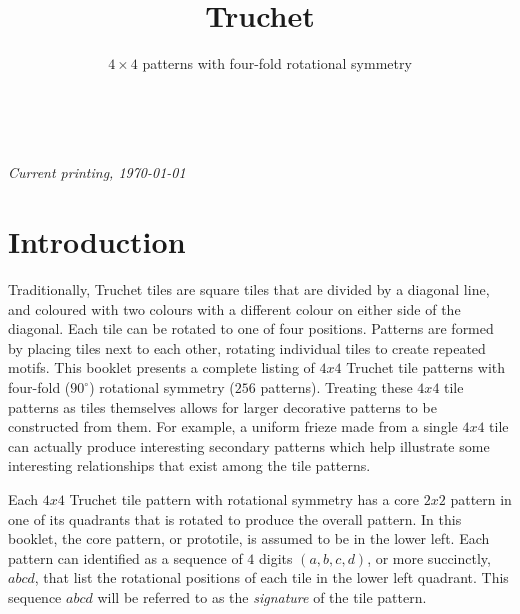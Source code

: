 \documentclass{tufte-book}
\title{Truchet}
\subtitle{$4\times4$ patterns with four-fold rotational symmetry}
\author[]{}
\begin{document}



\maketitle


\newpage
\begin{fullwidth}
~\vfill
\thispagestyle{empty}
\setlength{\parindent}{0pt}
\setlength{\parskip}{\baselineskip}

\par\textit{Current printing, \today}
\end{fullwidth}

\cleardoublepage

\chapter*{Introduction}

\noindent
Traditionally, Truchet tiles are square tiles that are divided by a diagonal line, and coloured with two colours with a different colour on either side of the diagonal. Each tile can be rotated to one of four positions. Patterns are formed by placing tiles next to each other, rotating individual tiles to create repeated motifs.
This booklet presents a complete listing of $4x4$ Truchet tile patterns with four-fold ($90^{\circ}$) rotational symmetry ($256$ patterns). \marginnote{\centering} Treating these $4x4$ tile patterns as tiles themselves allows for larger decorative patterns to be constructed from them. For example, a uniform frieze made from a single $4x4$ tile can actually produce interesting secondary patterns which help illustrate some interesting relationships that exist among the tile patterns.  

\vspace{0.5cm}
\noindent
Each $4x4$
Truchet tile pattern with rotational symmetry has a core $2x2$ pattern in one of its quadrants that is rotated to produce the overall pattern. \marginnote{\centering} In this booklet, the core pattern, or prototile, is assumed to be in the lower left. Each pattern can identified as a sequence of $4$ digits $(a,b,c,d)$, or more succinctly, $abcd$, that list the rotational positions of each tile in the lower left quadrant. This sequence $abcd$ will be referred to as the \textit{signature} of the tile pattern.
\end{document}
